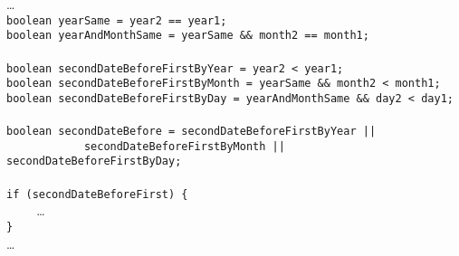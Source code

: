 \dots\\
\verb$boolean yearSame = year2 == year1;$\\
\verb$boolean yearAndMonthSame = yearSame && month2 == month1;$\\
\verb$$\\
\verb$boolean secondDateBeforeFirstByYear = year2 < year1;$\\
\verb$boolean secondDateBeforeFirstByMonth = yearSame && month2 < month1;$\\
\verb$boolean secondDateBeforeFirstByDay = yearAndMonthSame && day2 < day1;$\\
\verb$$\\
\verb$boolean secondDateBefore = secondDateBeforeFirstByYear ||$\\ 
\verb$            secondDateBeforeFirstByMonth || secondDateBeforeFirstByDay;$\\
\verb$$\\
\verb$if (secondDateBeforeFirst) { $\\
\verb$    $ \dots\\
\verb$}$\\
\dots\\